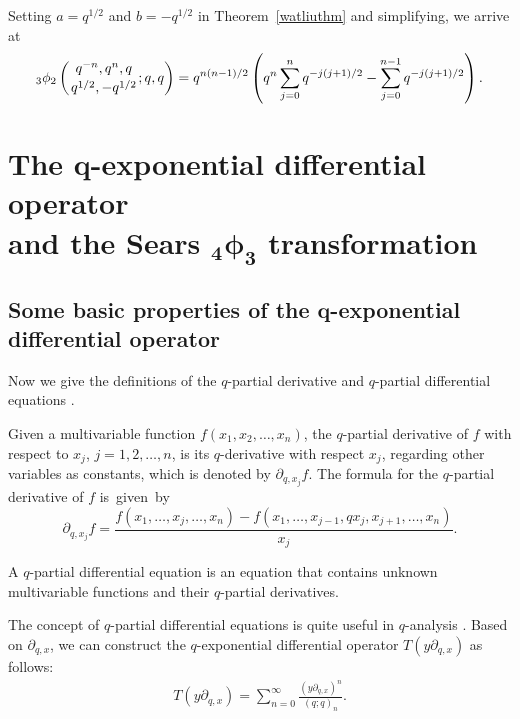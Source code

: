 \documentclass[10pt,a4paper]{amsart}
\numberwithin{equation}{section}
\begin{document}
Setting $a=q^{1/2}$ and $b=-q^{1/2}$ in Theorem~\ref{watliuthm} and simplifying, we arrive at \cite[equation~(5.3)]{Andrews2012}%
\begin{equation*}%
	{_3\phi_2}\left({{q^{-n}, q^{n}, q }\atop{q^{1/2}, -q^{1/2}}}; q, q\right)
	= q^{n(n-1)/2}\left(q^n \sum_{j=0}^n q^{-j(j+1)/2}
	-\sum_{j=0}^{n-1} q^{-j(j+1)/2}\right).
\end{equation*}



\section[The q-exponential differential operator and the Sears \_4phi\_3 transformation]{The $\boldsymbol{q}$-exponential differential operator\\ and the Sears $\boldsymbol{_4\phi_3}$ transformation}\label{sec3}

\subsection[Some basic properties of the q-exponential differential operator]{Some basic properties of the $\boldsymbol{q}$-exponential differential operator}

Now we give the definitions of the $q$-partial derivative and $q$-partial differential equations \cite{LiuHahn2015}.
{ \begin{Definition}%
Given a multivariable function $f(x_1, x_2, \dots, x_n)$, the $q$-partial derivative of $f$ with respect to $x_j$, $j=1, 2, \ldots, n$, is its $q$-derivative with respect
$x_j$, regarding other variables as constants, which is denoted by
 $\partial_{q, x_j}f$. The formula for the $q$-partial derivative of $f$ is~given~by
\begin{equation*}
\partial_{q, x_j}f=\frac{f(x_1, \ldots, x_{j}, \ldots, x_n)-f(x_1, \ldots, x_{j-1}, qx_{j}, x_{j+1}, \ldots, x_n)}{x_j}.
\end{equation*}
\end{Definition}}
\begin{Definition}%
A $q$-partial differential equation is an equation that contains unknown multivariable functions and their $q$-partial derivatives.
\end{Definition}
	
The concept of $q$-partial differential equations is quite useful in $q$-analysis \cite{AslanIsmail, LiuRam2013, LiuHahn2015, Liu2017}.
Based on $\partial_{q, x}$, we can construct the $q$-exponential differential operator $T(y\partial_{q, x})$ as follows:
\begin{align*}%
	T(y\partial_{q, x})=\sum_{n=0}^\infty \frac{(y \partial_{q, x})^n}{(q; q)_n}.
\end{align*}
\end{document}
